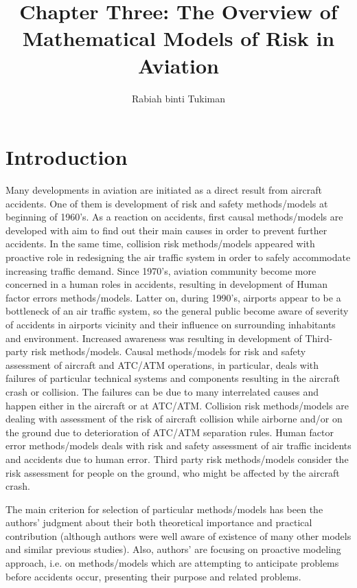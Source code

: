 \documentclass[a4paper, 10pt]{article}
\title{Chapter Three: The Overview of Mathematical Models of Risk in Aviation}
\author{Rabiah binti Tukiman}
\begin{document}
\maketitle
\section{Introduction}
Many developments in aviation are initiated as a direct
result from aircraft accidents. One of them is development of
risk and safety methods/models at beginning of 1960’s. As a
reaction on accidents, first causal methods/models are
developed with aim to find out their main causes in order to
prevent further accidents. In the same time, collision risk
methods/models appeared with proactive role in redesigning
the air traffic system in order to safely accommodate increasing
traffic demand. Since 1970’s, aviation community become
more concerned in a human roles in accidents, resulting in
development of Human factor errors methods/models. Latter
on, during 1990’s, airports appear to be a bottleneck of an air
traffic system, so the general public become aware of severity
of accidents in airports vicinity and their influence on
surrounding inhabitants and environment. Increased awareness
was resulting in development of Third-party risk
methods/models. Causal methods/models for risk and safety
assessment of aircraft and ATC/ATM operations, in particular,
deals with failures of particular technical systems and components resulting in the aircraft crash or collision. The
failures can be due to many interrelated causes and happen
either in the aircraft or at ATC/ATM. Collision risk
methods/models are dealing with assessment of the risk of
aircraft collision while airborne and/or on the ground due to
deterioration of ATC/ATM separation rules. Human factor
error methods/models deals with risk and safety assessment of
air traffic incidents and accidents due to human error. Third party risk methods/models consider the risk assessment for
people on the ground, who might be affected by the aircraft
crash.\par

The main criterion for selection of particular
methods/models has been the authors’ judgment about their
both theoretical importance and practical contribution
(although authors were well aware of existence of many other
models and similar previous studies). Also, authors’ are
focusing on proactive modeling approach, i.e. on
methods/models which are attempting to anticipate problems
before accidents occur, presenting their purpose and related
problems.\par
\end{document}
